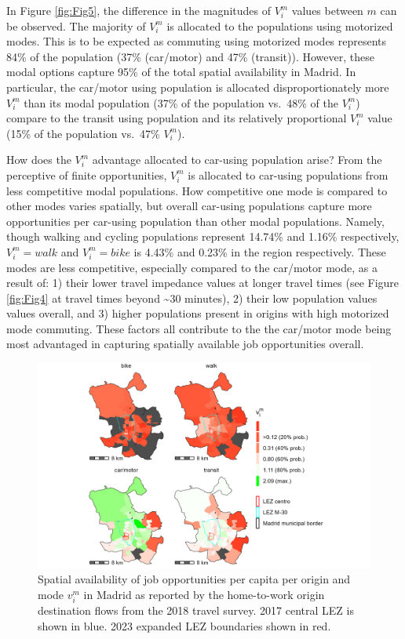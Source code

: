 \documentclass[]{trbunofficial}
\begin{document}
In Figure \ref{fig:Fig5}, the difference in the magnitudes of \(V_i^m\)
values between \(m\) can be observed. The majority of \(V_i^m\) is
allocated to the populations using motorized modes. This is to be
expected as commuting using motorized modes represents 84\% of the
population (37\% (car/motor) and 47\% (transit)). However, these modal
options capture 95\% of the total spatial availability in Madrid. In
particular, the car/motor using population is allocated
disproportionately more \(V_i^m\) than its modal population (37\% of the
population vs.~48\% of the \(V_i^m\)) compare to the transit using
population and its relatively proportional \(V_i^m\) value (15\% of the
population vs.~47\% \(V_i^m\)).

How does the \(V_i^m\) advantage allocated to car-using population
arise? From the perceptive of finite opportunities, \(V_i^m\) is
allocated to car-using populations from less competitive modal
populations. How competitive one mode is compared to other modes varies
spatially, but overall car-using populations capture more opportunities
per car-using population than other modal populations. Namely, though
walking and cycling populations represent 14.74\% and 1.16\%
respectively, \(V_i^m={walk}\) and \(V_i^m={bike}\) is 4.43\% and 0.23\%
in the region respectively. These modes are less competitive, especially
compared to the car/motor mode, as a result of: 1) their lower travel
impedance values at longer travel times (see Figure \ref{fig:Fig4} at
travel times beyond \textasciitilde30 minutes), 2) their low population
values values overall, and 3) higher populations present in origins with
high motorized mode commuting. These factors all contribute to the the
car/motor mode being most advantaged in capturing spatially available
job opportunities overall.

\begin{figure}

{\centering \includegraphics[width=1\linewidth]{images/SA_im_vv_zn208_plot} 

}

\caption{\label{fig:Fig6} Spatial availability of job opportunities per capita per origin and mode $v_i^m$ in Madrid as reported by the home-to-work origin destination flows from the 2018 travel survey. 2017 central LEZ is shown in blue. 2023 expanded LEZ boundaries shown in red.}\label{fig:SA-per-capita-m-plot}
\end{figure}
\end{document}
